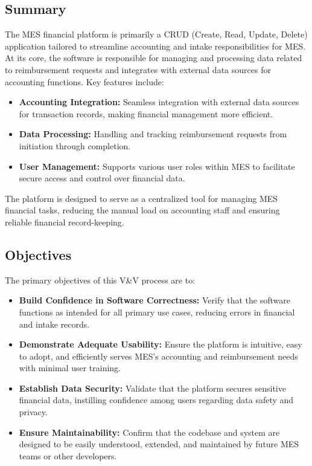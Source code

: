 \documentclass[12pt, titlepage]{article}
\begin{document}
\subsection{Summary}

The MES financial platform is primarily a CRUD (Create, Read, Update, Delete) application tailored to streamline accounting and intake responsibilities for MES. At its core, the software is responsible for managing and processing data related to reimbursement requests and integrates with external data sources for accounting functions. Key features include:

\begin{itemize}
    \item \textbf{Accounting Integration:} Seamless integration with external data sources for transaction records, making financial management more efficient.
    \item \textbf{Data Processing:} Handling and tracking reimbursement requests from initiation through completion.
    \item \textbf{User Management:} Supports various user roles within MES to facilitate secure access and control over financial data.
\end{itemize}

The platform is designed to serve as a centralized tool for managing MES financial tasks, reducing the manual load on accounting staff and ensuring reliable financial record-keeping.

\subsection{Objectives}

The primary objectives of this V\&V process are to:

\begin{itemize}
    \item \textbf{Build Confidence in Software Correctness:} Verify that the software functions as intended for all primary use cases, reducing errors in financial and intake records.
    \item \textbf{Demonstrate Adequate Usability:} Ensure the platform is intuitive, easy to adopt, and efficiently serves MES's accounting and reimbursement needs with minimal user training.
    \item \textbf{Establish Data Security:} Validate that the platform secures sensitive financial data, instilling confidence among users regarding data safety and privacy.
    \item \textbf{Ensure Maintainability:} Confirm that the codebase and system are designed to be easily understood, extended, and maintained by future MES teams or other developers.
\end{itemize}
\end{document}
